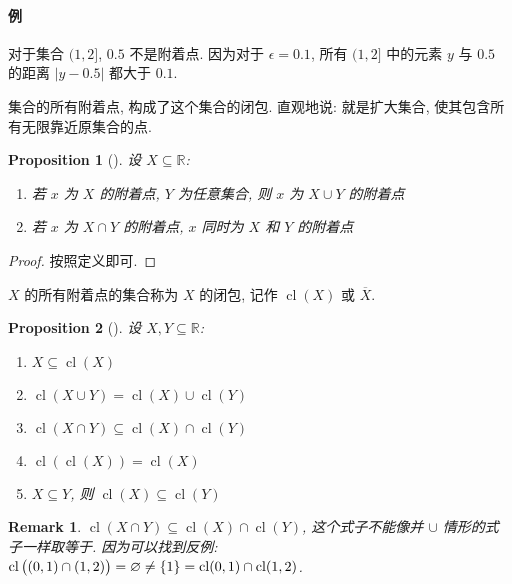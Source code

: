 \documentclass[UTF8]{ctexart}
\theoremstyle{mystyle}
\newtheorem{proposition}{Proposition}[section]
\theoremstyle{myremark}
\newtheorem*{remark}{Remark}
\theoremstyle{plain}
\newcommand{\R}{\mathbb R}
\DeclarePairedDelimiter\set{\{}{\}}
\DeclareMathOperator{\cl}{cl}
\begin{document}
\paragraph{例}
对于集合 $ (1, 2] $, $ 0.5 $ 不是附着点. 因为对于 $ \epsilon = 0.1 $, 所有 $ (1, 2] $ 中的元素 $ y $ 与 $ 0.5 $ 的距离 $ |y - 0.5| $ 都大于 $ 0.1 $.

集合的所有附着点, 构成了这个集合的闭包. 直观地说: 就是扩大集合, 使其包含所有无限靠近原集合的点.

\begin{proposition}[] 设 $ X \subseteq \R $:
    \begin{enumerate}
        \item 若 $ x $ 为 $ X $ 的附着点, $ Y $ 为任意集合, 则 $ x $ 为 $ X \cup Y $ 的附着点
        \item 若 $ x $ 为 $ X \cap Y $ 的附着点, $ x $ 同时为 $ X $ 和 $ Y $ 的附着点
    \end{enumerate}
\end{proposition}

\begin{proof}
    按照定义即可.
\end{proof}

\begin{definition}
    $ X $ 的所有附着点的集合称为 $ X $ 的闭包, 记作 $ \cl (X) $ 或 $ \overline X $.
\end{definition}

\begin{proposition}[] 设 $ X, Y \subseteq \R $:
    \begin{enumerate}
        \item $ X \subseteq \cl (X) $
        \item $ \cl (X \cup Y) = \cl (X) \cup \cl (Y) $
        \item $ \cl (X \cap Y) \subseteq \cl (X) \cap \cl (Y) $
        \item $ \cl (\cl (X)) = \cl (X) $
        \item $ X \subseteq Y $, 则 $ \cl (X) \subseteq \cl (Y) $
    \end{enumerate}
\end{proposition}

\begin{remark}
    $ \cl(X \cap Y) \subseteq \cl(X) \cap \cl(Y) $, 这个式子不能像并 $ \cup $ 情形的式子一样取等于. 因为可以找到反例: $ \cl \big( (0, 1) \cap (1, 2) \big) = \varnothing \neq \set{1} = \cl(0, 1) \cap \cl(1, 2) $.
\end{remark}
\end{document}
